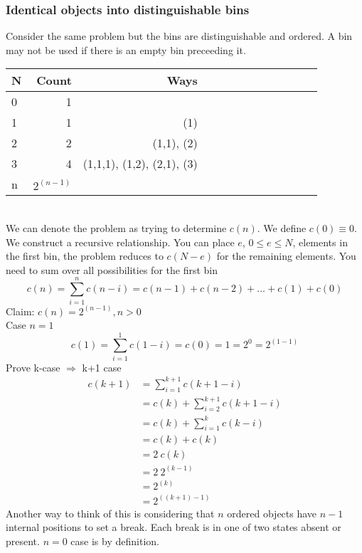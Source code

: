 \documentclass[a4paper]{scrartcl}
\begin{document}
\subsubsection{Identical objects into distinguishable bins}
Consider the same problem but the bins are distinguishable and ordered. A bin may not be used if there is an empty bin preceeding it.\\
\begin{tabular}
{| l | r | r | r | r | c | c | c | c | c | c | c | c | } \hline
N & Count & Ways \\ \hline
0 & 1 & \\ \hline
1 & 1 & (1) \\ \hline
2 & 2 & (1,1), (2) \\ \hline
3 & 4 & (1,1,1), (1,2), (2,1), (3) \\ \hline
n & $2^{(n-1)}$ & \\ \hline
\end{tabular} \\
We can denote the problem as trying to determine $c(n)$. We define $c(0) \equiv 0$.
We construct a recursive relationship. You can place $e$, $ 0 \leq e \leq N$, elements in the first bin, the problem reduces to $c(N-e)$ for the remaining elements. You need to sum over all possibilities for the first bin
$$c(n) = \sum_{i=1}^{n} c(n-i) = c(n-1) + c(n-2) + \ldots + c(1) + c(0)$$
Claim: $c(n) = 2^{(n-1)}, n>0$\\
Case $n=1$
$$c(1) = \sum_{i=1}^{1} c(1-i) = c(0) = 1 = 2^{0} = 2^{(1-1)}$$
Prove k-case $\Rightarrow$ k+1 case 
\begin{align*}
c(k+1) &= \sum_{i=1}^{k+1} c(k+1-i) \\
&= c(k) + \sum_{i=2}^{k+1} c(k+1-i)\\
&= c(k) + \sum_{i=1}^{k} c(k-i) \\
&= c(k) + c(k)\\
&= 2\ c(k) \\
&= 2\ 2^{(k-1)} \\
&= 2^{(k)} \\
&= 2^{((k+1)-1)}
\end{align*}
Another way to think of this is considering that $n$ ordered objects have $n-1$ internal positions to set a break. Each break is in one of two states absent or present. $n=0$ case is by definition.\\
\end{document}
